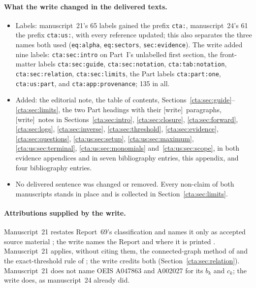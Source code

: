 \documentclass[11pt]{article}
\theoremstyle{definition}
\theoremstyle{remark}
\newcommand{\wtag}{\textup{[write]}}
\begin{document}
\paragraph{What the write changed in the delivered texts.}
\begin{itemize}
\item Labels: manuscript~21's 65 labels gained the prefix \texttt{cta:},
manuscript~24's 61 the prefix \texttt{cta:us:}, with every reference
updated; this also separates the three names both used
(\texttt{eq:alpha}, \texttt{eq:sectors}, \texttt{sec:evidence}). The write
added nine labels: \texttt{cta:sec:intro} on Part~I's unlabelled first
section, the front-matter labels \texttt{cta:sec:guide},
\texttt{cta:sec:notation}, \texttt{cta:tab:notation},
\texttt{cta:sec:relation}, \texttt{cta:sec:limits}, the Part labels
\texttt{cta:part:one}, \texttt{cta:us:part}, and
\texttt{cta:app:provenance}; 135 in all.
\item Added: the editorial note, the table of contents,
Sections~\ref{cta:sec:guide}--\ref{cta:sec:limits}, the two Part headings
with their \wtag\ paragraphs, \wtag\ notes in
Sections~\ref{cta:sec:intro}, \ref{cta:sec:closure}, \ref{cta:sec:forward},
\ref{cta:sec:logs}, \ref{cta:sec:inverse}, \ref{cta:sec:threshold},
\ref{cta:sec:evidence}, \ref{cta:sec:questions},
\ref{cta:us:sec:setup}, \ref{cta:us:sec:maximum}, \ref{cta:us:sec:terminal},
\ref{cta:us:sec:monomials} and~\ref{cta:us:sec:scope}, in both evidence
appendices and in seven bibliography entries, this appendix, and four
bibliography entries.
\item No delivered sentence was changed or removed. Every non-claim of
both manuscripts stands in place and is collected in
Section~\ref{cta:sec:limits}.
\end{itemize}

\paragraph{Attributions supplied by the write.} Manuscript~21 restates
Report~69's classification and names it only as accepted source material
\cite{native,lowaudit}; the write names the Report and where it is printed
\cite{smc}. Manuscript~21 applies, without citing them, the
connected-graph method of \cite[Chapter~8]{cti} and the exact-threshold
rule of \cite[Theorem~J.43]{tsvol}; the write credits both
(Section~\ref{cta:sec:relation}). Manuscript~21 does not name OEIS A047863
and A002027 for its $b_k$ and $c_k$; the write does, as manuscript~24
already did.
\end{document}
